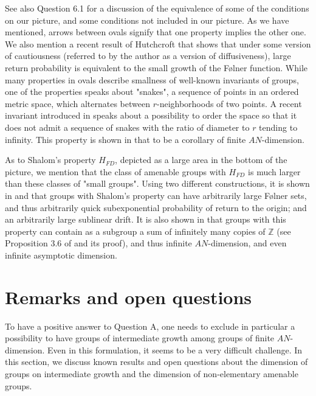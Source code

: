 \documentclass{amsart}
\numberwithin{figure}{section}
\theoremstyle{plain}
\theoremstyle{definition}
\begin{document}
See also Question 6.1 \cite{erschlerzhengLLN} for a discussion of the equivalence of some of the  conditions on our picture, and some conditions not included in our picture. As we have mentioned, arrows between ovals signify that one property implies the other one. We also mention a recent result of Hutchcroft that shows that under some version of cautiousness (referred to by the author as a version of diffusiveness), large return probability is equivalent to the small growth of the F{\o}lner function. 
While many properties in ovals describe smallness of well-known invariants of groups, one of the properties  speaks
about "snakes", a sequence of points in  an ordered metric space,
which alternates between $r$-neighborhoods of two points.
A recent invariant introduced in \cite{ErschlerMitrofanov2}
speaks about a possibility to order the space so that it does not admit a sequence of snakes with the ratio of diameter to $r$ tending to infinity.
This property is shown in that \cite{ErschlerMitrofanov2} to be a corollary of finite $AN$-dimension.

As to Shalom's property $H_{FD}$, depicted as a large area in the bottom of the picture, we mention that the class of amenable groups with $H_{FD}$
is much larger than these classes of "small groups". Using two different constructions, it is shown in \cite{brieusselzhengHFD} and \cite{erschlerzheng}
that groups with Shalom's property can have arbitrarily large F{\o}lner sets, and thus arbitrarily quick subexponential probability of return to the origin; and an  arbitrarily large sublinear drift. It is also shown in \cite{brieusselzhengHFD} that groups with this property can contain as a subgroup a sum of infinitely many copies of $\mathbb{Z}$ (see Proposition 3.6 of \cite{brieusselzhengHFD} and its proof), and thus infinite $AN$-dimension, and even infinite asymptotic dimension.


\section{Remarks and open questions} \label{sec:questions}

To have a  positive answer to  Question A, one  needs to exclude in particular a possibility to have groups of intermediate growth among groups of finite $AN$-dimension. 
Even in this formulation, it seems to be a very difficult challenge.
In this section, we discuss  known results  and open questions about the dimension of groups on intermediate growth and the dimension of non-elementary amenable groups. 
\end{document}
